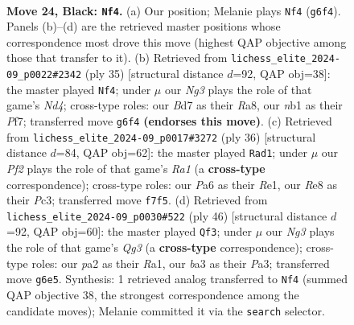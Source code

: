 \documentclass[11pt]{article}
\begin{document}
\clearpage

\begin{figure}[p]\centering
\begin{subfigure}{0.46\textwidth}\centering
\resizebox{\linewidth}{!}{%
\newchessgame
\chessboard[
  setfen={r3r1k1/bp1b1pp1/pq2p1n1/7P/3p4/BP5B/P2P1PQP/RN2RK2 b - - 0 24},
  showmover=false,
  pgfstyle=straightmove, color=movearrow, markmove={g6-f4}
]}
\caption{}
\end{subfigure}\hfill
\begin{subfigure}{0.46\textwidth}\centering
\resizebox{\linewidth}{!}{%
\newchessgame
\chessboard[
  setfen={r2r2k1/p1q2pb1/2p1b1pp/2Bnp3/2B1N1PP/5P2/PPP2Q2/2KR3R b - - 2 18},
  showmover=false,
  pgfstyle=straightmove, color=movearrow, markmove={d5-f4}
]}
\caption{}
\end{subfigure}
\\[4pt]
\begin{subfigure}{0.46\textwidth}\centering
\resizebox{\linewidth}{!}{%
\newchessgame
\chessboard[
  setfen={2rrb1k1/1p3ppp/2q1pn2/pNb5/P4B2/1BP5/1P2QPPP/R3R1K1 w - - 9 19},
  showmover=false,
  pgfstyle=straightmove, color=movearrow, markmove={a1-d1}
]}
\caption{}
\end{subfigure}\hfill
\begin{subfigure}{0.46\textwidth}\centering
\resizebox{\linewidth}{!}{%
\newchessgame
\chessboard[
  setfen={2br2k1/1p2qppp/2p5/p1b3r1/4PN2/PPB3Q1/3P1PPP/R3R1K1 w - - 7 24},
  showmover=false,
  pgfstyle=straightmove, color=movearrow, markmove={g3-f3}
]}
\caption{}
\end{subfigure}
\caption{\textbf{Move 24, Black: \texttt{Nf4}.} (a) Our position; Melanie plays \texttt{Nf4} (\texttt{g6f4}). Panels (b)--(d) are the retrieved master positions whose correspondence most drove this move (highest QAP objective among those that transfer to it). (b) Retrieved from \texttt{lichess\_elite\_2024-09\_p0022\#2342} (ply 35) [structural distance $d$=92, QAP obj=38]: the master played \texttt{Nf4}; under $\mu$ our \emph{Ng3} plays the role of that game's \emph{Nd4}; cross-type roles: our \emph{B}d7 as their \emph{R}a8, our \emph{n}b1 as their \emph{P}f7; transferred move \texttt{g6f4} \textbf{(endorses this move)}. (c) Retrieved from \texttt{lichess\_elite\_2024-09\_p0017\#3272} (ply 36) [structural distance $d$=84, QAP obj=62]: the master played \texttt{Rad1}; under $\mu$ our \emph{Pf2} plays the role of that game's \emph{Ra1} (a \textbf{cross-type} correspondence); cross-type roles: our \emph{P}a6 as their \emph{R}e1, our \emph{R}e8 as their \emph{P}c3; transferred move \texttt{f7f5}. (d) Retrieved from \texttt{lichess\_elite\_2024-09\_p0030\#522} (ply 46) [structural distance $d$=92, QAP obj=60]: the master played \texttt{Qf3}; under $\mu$ our \emph{Ng3} plays the role of that game's \emph{Qg3} (a \textbf{cross-type} correspondence); cross-type roles: our \emph{p}a2 as their \emph{R}a1, our \emph{b}a3 as their \emph{P}a3; transferred move \texttt{g6e5}. Synthesis: 1 retrieved analog transferred to \texttt{Nf4} (summed QAP objective 38, the strongest correspondence among the candidate moves); Melanie committed it via the \texttt{search} selector.}
\label{fig:thought-m47}
\end{figure}
\end{document}
